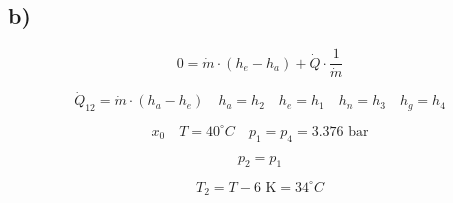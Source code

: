

\subsection*{b)}

\[
0 = \dot{m} \cdot (h_e - h_a) + \dot{Q} \cdot \frac{1}{\dot{m}}
\]

\[
\dot{Q}_{12} = \dot{m} \cdot (h_a - h_e) \quad h_a = h_2 \quad h_e = h_1 \quad h_n = h_3 \quad h_g = h_4
\]

\[
x_0 \quad T = 40^\circ C \quad p_1 = p_4 = 3.376 \text{ bar}
\]

\[
p_2 = p_1
\]

\[
T_2 = T - 6 \text{ K} = 34^\circ C
\]